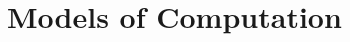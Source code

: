 \documentclass{article}
\begin{document}
\section{Models of Computation}
\begin{comment}
\subsection{Our Origins} 
 
Until Alan Turing's seminal work in 1936, computation was an activity
of the human mind; much like love and peace. While aspects of the idea
predated the twentieth century, it was Turing who established the idea
that computation has a formal interpretation and that all
computability can be captured within a formal system. Implicit in this
achievement however is the idea that abstract models of computation
are just that -- \emph{abstractions of computation realized in the
  physical world.}  In fact, one of the major achievements of Computer
Science has been the development of abstract models of computation
that shield the discipline from the underlying technology. As
effective as these models have been, one must note, however, that they
\emph{embody several implicit physical assumptions}.  As Tommaso
Toffoli explains in his influential 1980 paper:

{\begin{quote} Mathematical models of computation are abstract
  constructions, by their nature unfettered by physical laws. However,
  if these models are to give indications that are relevant to
  concrete computing, they must somehow capture, albeit in a selective
  and stylized way, certain general physical restrictions to which all
  concrete computing processes are subjected~\cite{Toffoli:1980}.
\end{quote}}

Our logic of programs and our hardware are based on Boolean Logic. We go back
to Boole's 1853 book entitled \emph{An Investigation of the Laws of Thought,
  on which are Founded the Mathematical Theories of Logic and
  Probabilities}. The opening sentence of Ch.~1 is:
\begin{quote}
  The design of the following treatise is to investigate the fundamental laws
  of those operations of the mind by which reasoning is performed; \ldots
\end{quote}
A few chapters later, we find:
\begin{quote}
  \textbf{Proposition IV.}  That axiom of metaphysicians which is termed the
  principle of contradiction, and which affirms that it is impossible for any
  being to possess a quality, and at the same time not to possess it, is a
  consequence of the fundamental law of thought, whose expression is $x^2 =
  x$.
\end{quote}
A detailed historical analysis of Boole's ideas are beyond the scope of this
book. The above quotes, however, should convey the idea that our hardware is
based on assumptions that Boole found as reasonable laws in 1853. 


\end{comment}
\end{document}
